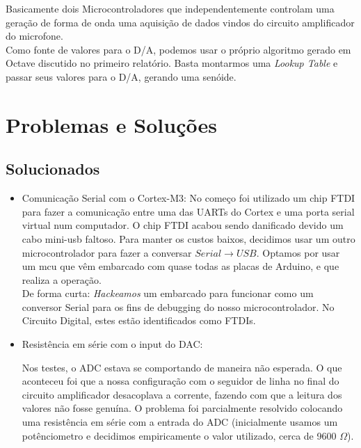 \documentclass[12pt,a4paper]{report}
\begin{document}
	Basicamente dois Microcontroladores que independentemente controlam uma geração de forma de onda uma aquisição de dados vindos do circuito amplificador do microfone.\\
	
	Como fonte de valores para o D/A, podemos usar o próprio algoritmo gerado em Octave discutido no primeiro relatório. Basta montarmos uma {\it Lookup Table} e passar seus valores para o D/A, gerando uma senóide. 
	
	
	\chapter{Problemas e Soluções}
	
	\section{Solucionados}
	
	\begin{itemize}
		
		
		\item Comunicação Serial com o Cortex-M3:
		No começo foi utilizado um chip FTDI para fazer a comunicação entre uma das UARTs do Cortex e uma porta serial virtual num computador. O chip FTDI acabou sendo danificado devido um cabo mini-usb faltoso. Para manter os custos baixos, decidimos usar um outro microcontrolador para fazer a conversar $Serial \to USB$. Optamos por usar um mcu que vêm embarcado com quase todas as placas de Arduino, e que realiza a operação.\\
		
		De forma curta: {\it Hackeamos} um embarcado para funcionar como um conversor Serial para os fins de debugging do nosso microcontrolador. No Circuito Digital, estes estão identificados como FTDIs.
		
		\item Resistência em série com o input do DAC:
		
		Nos testes, o ADC estava se comportando de maneira não esperada. O que aconteceu foi que a nossa configuração com o seguidor de linha no final do circuito amplificador desacoplava a corrente, fazendo com que a leitura dos valores não fosse genuína. O problema foi parcialmente resolvido colocando uma resistência em série com a entrada do ADC (inicialmente usamos um potênciometro e decidimos empiricamente o valor utilizado, cerca de 9600 $\Omega$).
		
	\end{itemize}
	
\end{document}
